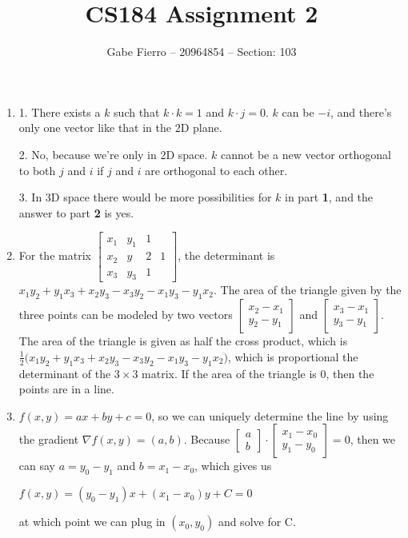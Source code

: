 \documentclass{article}
\title{CS184 Assignment 2}
\author{Gabe Fierro -- 20964854 -- Section: 103}
\date{}
\begin{document}
	\maketitle
\begin{enumerate}
	\item 

1. There exists a $k$ such that $k\cdot k = 1$ and $k\cdot j = 0$. $k$ can be $-i$, and there's only one vector like that in the 2D plane.

2. No, because we're only in 2D space. $k$ cannot be a new vector orthogonal to both $j$ and $i$ if $j$ and $i$ are orthogonal to each other.

3. In 3D space there would be more possibilities for $k$ in part {\bf 1}, and the answer to part {\bf 2} is yes.


	\item For the matrix $\begin{bmatrix} x_1 & y_1 & 1 \\ x_2 & y&2 & 1 \\ x_3 & y_3 & 1 \end{bmatrix} $, the determinant is $x_1y_2+y_1x_3+x_2y_3-x_3y_2-x_1y_3-y_1x_2$. The area of the triangle given by the three points can be modeled by two vectors $\begin{bmatrix} x_2-x_1 \\ y_2-y_1 \end{bmatrix} $ and $\begin{bmatrix} x_3-x_1 \\ y_3-y_1 \end{bmatrix} $. The area of the triangle is given as half the cross product, which is $\frac{1}{2}\big(x_1y_2+y_1x_3+x_2y_3-x_3y_2-x_1y_3-y_1x_2\big)$, which is proportional the determinant of the $3\times 3$ matrix. If the area of the triangle is 0, then the points are in a line.
	
	\item $f(x,y)=ax+by+c=0$, so we can uniquely determine the line by using the gradient $\nabla f(x,y)=(a,b)$. Because $\begin{bmatrix} a \\ b \end{bmatrix} \cdot \begin{bmatrix} x_1-x_0 \\ y_1-y_0 \end{bmatrix} = 0 $, then we can say $a=y_0-y_1$ and $b=x_1-x_0$, which gives us \begin{center}$f(x,y)=(y_0-y_1)x+(x_1-x_0)y+C=0$\end{center} at which point we can plug in $(x_0,y_0)$ and solve for C.
	

\end{enumerate}
\end{document}
